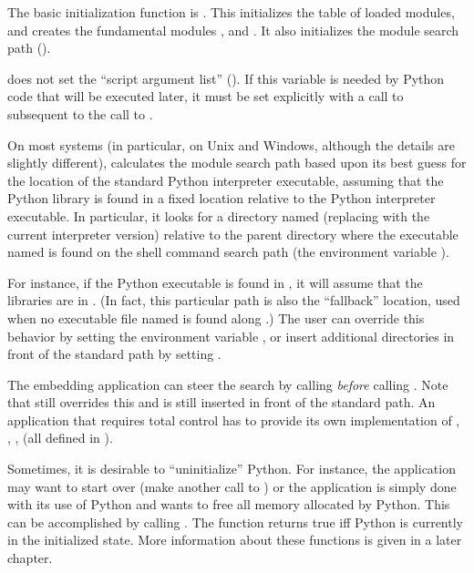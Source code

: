 The basic initialization function is .  This 
initializes the table of loaded modules, and creates the fundamental 
modules ,  and .  It also 
initializes the module search path ().

 does not set the ``script argument list'' 
().  If this variable is needed by Python code that 
will be executed later, it must be set explicitly with a call to 
 subsequent to the call 
to .

On most systems (in particular, on Unix and Windows, although the
details are slightly different),  calculates the
module search path based upon its best guess for the location of the
standard Python interpreter executable, assuming that the Python
library is found in a fixed location relative to the Python
interpreter executable.  In particular, it looks for a directory named
 (replacing  with the current
interpreter version) relative to the parent directory where the
executable named  is found on the shell command search
path (the environment variable ).

For instance, if the Python executable is found in
, it will assume that the libraries are in
.  (In fact, this particular path is
also the ``fallback'' location, used when no executable file named
 is found along .)  The user can override
this behavior by setting the environment variable ,
or insert additional directories in front of the standard path by
setting .

The embedding application can steer the search by calling 
 \emph{before} calling 
.  Note that  still overrides 
this and  is still inserted in front of the 
standard path.  An application that requires total control has to
provide its own implementation of ,
, ,
 (all defined in
).

Sometimes, it is desirable to ``uninitialize'' Python.  For instance, 
the application may want to start over (make another call to 
) or the application is simply done with its 
use of Python and wants to free all memory allocated by Python.  This
can be accomplished by calling .  The function
 returns true iff Python is currently in the
initialized state.  More information about these functions is given in
a later chapter.


